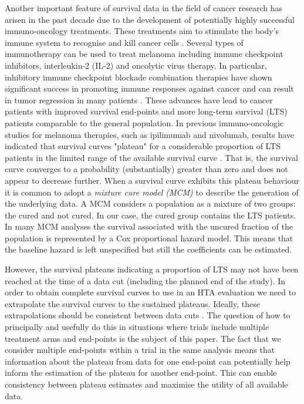 \documentclass[AMA,STIX1COL]{WileyNJD-v2}
\begin{document}
Another important feature of survival data in the field of cancer research has arisen in the past decade due to the development of potentially highly successful immuno-oncology treatments.
These treatments aim to stimulate the body’s immune system to recognise and kill cancer cells \cite{Ouwens2019}. Several types of immunotherapy can be used to treat melanoma including immune checkpoint inhibitors, interleukin-2 (IL-2) and oncolytic virus therapy.
In particular, inhibitory immune checkpoint blockade combination therapies have shown significant success in promoting immune responses against cancer and can result in tumor regression in many patients \cite{Khair2019}.
These advances have lead to cancer patients with improved survival end-points and more long-term survival (LTS) patients comparable to the general population.
In previous immuno-oncologic studies for melanoma therapies, such as ipilimumab and nivolumab,
results have indicated that survival curves "plateau" for a considerable proportion of LTS patients in the limited range of the available survival curve \citep{Wolchok2017, Larkin2019}.
That is, the survival curve converges to a probability (substantially) greater than zero and does not appear to decrease further.
When a survival curve exhibits this plateau behaviour it is common to adopt a \textit{mixture cure model (MCM)} to describe the generation of the underlying data.
A MCM considers a population as a mixture of two groups: the cured and not cured.
In our case, the cured group contains the LTS patients.
In many MCM analyses the survival associated with the uncured fraction of the population is represented by a Cox proportional hazard model.
This means that the baseline hazard is left unspecified but still the coefficients can be estimated.

However, the survival plateaus indicating a proportion of LTS may not have been reached at the time of a data cut (including the planned end of the study).
In order to obtain complete survival curves to use in an HTA evaluation we need to extrapolate the survival curves to the sustained plateaus.
Ideally, these extrapolations should be consistent between data cuts \citep{Bullement2020}.
The question of how to principally and usefully do this in situations where trials include multiple treatment arms and end-points is the subject of this paper.
The fact that we consider multiple end-points within a trial in the same analysis means that information about the plateau from data for one end-point can potentially help inform the estimation of the plateau for another end-point.
This can enable consistency between plateau estimates and maximise the utility of all available data.
\end{document}
